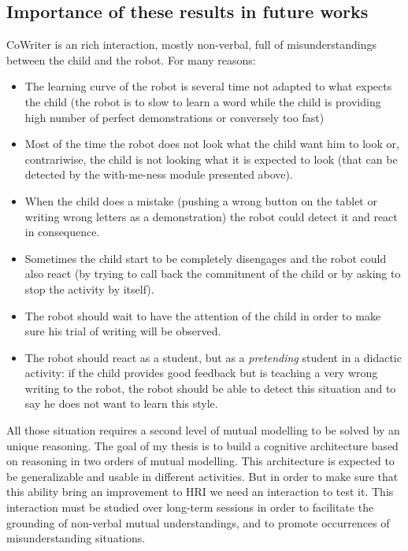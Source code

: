 \documentclass[10pt,a4paper]{article}
\begin{document}
\subsection{Importance of these results in future works}
CoWriter is an rich interaction, mostly non-verbal, full of misunderstandings between the child and the robot. For many reasons:
\begin{itemize}

\item The learning curve of the robot is several time not adapted to what expects the child (the robot is to slow to learn a word while the child is providing high number of perfect demonstrations or conversely too fast)
\item Most of the time the robot does not look what the child want him to look or, contrariwise, the child is not looking what it is expected to look (that can be detected by the with-me-ness module presented above). 
\item When the child does a mistake (pushing a wrong button on the tablet or writing wrong letters as a demonstration) the robot could detect it and react in consequence.
\item Sometimes the child start to be completely disengages and the robot could also react (by trying to call back the commitment of the child or by asking to stop the activity by itself).
\item The robot should wait to have the attention of the child in order to make sure his trial of writing will be observed.
\item The robot should react as a student, but as a \textit{pretending} student in a didactic activity: if the child provides good feedback but is teaching a very wrong writing to the robot, the robot should be able to detect this situation and to say he does not want to learn this style. 

\end{itemize}
All those situation requires a second level of mutual modelling to be solved by an unique reasoning.
The goal of my thesis is to build a cognitive architecture based on reasoning in two orders of mutual modelling. This architecture is expected to be generalizable and usable in different activities. But in order to make sure that this ability bring an improvement to HRI we need an interaction to test it. This interaction must be studied over long-term sessions in order to facilitate the grounding of non-verbal mutual understandings, and to promote occurrences of misunderstanding situations. 
\end{document}
